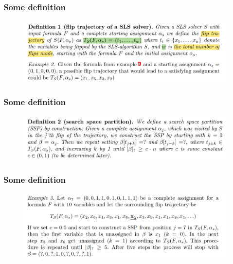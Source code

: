 \documentclass[aspectratio=169%
,serif,mathserif]{beamer}
\begin{document}
\begin{frame}
	\frametitle{Some definition}
	\begin{figure}[htbp]
		\includegraphics[width=1\linewidth]{2.png}
	\end{figure}
\end{frame}

\begin{frame}
	\frametitle{Some definition}
	\begin{figure}[htbp]
		\includegraphics[width=1\linewidth]{3.png}
	\end{figure}
\end{frame}

\begin{frame}
	\frametitle{Some definition}
	\begin{figure}[htbp]
		\includegraphics[width=1\linewidth]{4.png}
	\end{figure}
\end{frame}

\end{document}
